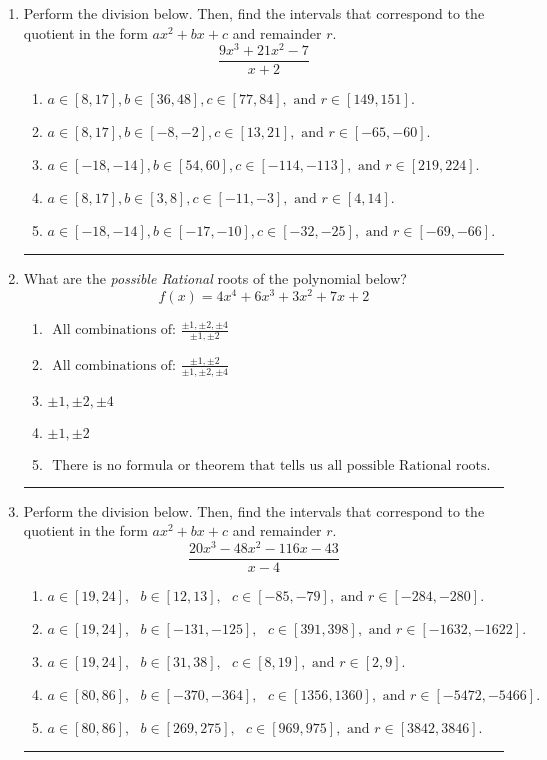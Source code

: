 \documentclass[14pt]{extbook}
\newcommand{\litem}[1]{\item#1\hspace*{-1cm}\rule{\textwidth}{0.4pt}}
\begin{document}
\begin{enumerate}
{\begin{enumerate}[label=\Alph*.]
\end{enumerate} }
\litem{
Perform the division below. Then, find the intervals that correspond to the quotient in the form $ax^2+bx+c$ and remainder $r$.\[ \frac{9x^{3} +21 x^{2} -7}{x + 2} \]\begin{enumerate}[label=\Alph*.]
\item \( a \in [8, 17], b \in [36, 48], c \in [77, 84], \text{ and } r \in [149, 151]. \)
\item \( a \in [8, 17], b \in [-8, -2], c \in [13, 21], \text{ and } r \in [-65, -60]. \)
\item \( a \in [-18, -14], b \in [54, 60], c \in [-114, -113], \text{ and } r \in [219, 224]. \)
\item \( a \in [8, 17], b \in [3, 8], c \in [-11, -3], \text{ and } r \in [4, 14]. \)
\item \( a \in [-18, -14], b \in [-17, -10], c \in [-32, -25], \text{ and } r \in [-69, -66]. \)

\end{enumerate} }
\litem{
What are the \textit{possible Rational} roots of the polynomial below?\[ f(x) = 4x^{4} +6 x^{3} +3 x^{2} +7 x + 2 \]\begin{enumerate}[label=\Alph*.]
\item \( \text{ All combinations of: }\frac{\pm 1,\pm 2,\pm 4}{\pm 1,\pm 2} \)
\item \( \text{ All combinations of: }\frac{\pm 1,\pm 2}{\pm 1,\pm 2,\pm 4} \)
\item \( \pm 1,\pm 2,\pm 4 \)
\item \( \pm 1,\pm 2 \)
\item \( \text{ There is no formula or theorem that tells us all possible Rational roots.} \)

\end{enumerate} }
\litem{
Perform the division below. Then, find the intervals that correspond to the quotient in the form $ax^2+bx+c$ and remainder $r$.\[ \frac{20x^{3} -48 x^{2} -116 x -43}{x -4} \]\begin{enumerate}[label=\Alph*.]
\item \( a \in [19, 24], \text{   } b \in [12, 13], \text{   } c \in [-85, -79], \text{   and   } r \in [-284, -280]. \)
\item \( a \in [19, 24], \text{   } b \in [-131, -125], \text{   } c \in [391, 398], \text{   and   } r \in [-1632, -1622]. \)
\item \( a \in [19, 24], \text{   } b \in [31, 38], \text{   } c \in [8, 19], \text{   and   } r \in [2, 9]. \)
\item \( a \in [80, 86], \text{   } b \in [-370, -364], \text{   } c \in [1356, 1360], \text{   and   } r \in [-5472, -5466]. \)
\item \( a \in [80, 86], \text{   } b \in [269, 275], \text{   } c \in [969, 975], \text{   and   } r \in [3842, 3846]. \)


\end{enumerate}}
\end{enumerate}
\end{document}
